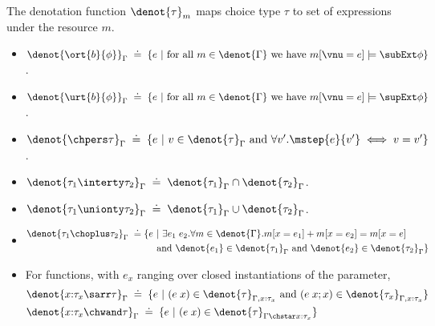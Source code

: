 \begin{definition}
    The denotation function $\denot{\tau}_m$ maps choice type $\tau$ to set of expressions under the resource $m$.
    \begin{itemize}
    \item $\denot{\ort{b}{\phi}}_\Gamma \;\doteq\;
          \{ e ~|~ \text{for all } m \in \denot{\Gamma} \text{ we have } m[\vnu = e] \models \subExt\phi \}$.
    \item $\denot{\urt{b}{\phi}}_\Gamma \;\doteq\;
          \{ e ~|~ \text{for all } m \in \denot{\Gamma} \text{ we have } m[\vnu = e] \models \supExt\phi \}$.
    \item $\denot{\chpers \tau}_\Gamma \;\doteq\;
          \{ e ~|~ v \in \denot{\tau}_\Gamma \text{ and } \forall v'. \mstep{e}{v'} \iff v = v' \}$.
    \item $\denot{\tau_1 \interty \tau_2}_\Gamma \;\doteq\;
          \denot{\tau_1}_\Gamma \cap \denot{\tau_2}_\Gamma$.
    \item $\denot{\tau_1 \unionty \tau_2}_\Gamma \;\doteq\;
          \denot{\tau_1}_\Gamma \cup \denot{\tau_2}_\Gamma$.
    \item 
    \begin{align*}
      \denot{\tau_1 \choplus \tau_2}_\Gamma \;\doteq\;&
          \{ e ~|~ \exists e_1\;e_2. \forall m \in \denot{\Gamma}. m[x=e_1] + m[x=e_2] = m[x=e] 
          \\ &\quad \text{ and } \denot{e_1} \in \denot{\tau_1}_\Gamma \text{ and } \denot{e_2} \in \denot{\tau_2}_\Gamma \}
    \end{align*}
    \item For functions, with $e_x$ ranging over closed instantiations of
      the parameter,
      \begin{align*}
        &\denot{x{:}\tau_x \sarr \tau}_\Gamma
          \;\doteq\;
          \{ e ~|~ (e\;x) \in \denot{\tau}_{\Gamma, x {:} \tau_x} \text{ and } (e\;x;x) \in \denot{\tau_x}_{\Gamma, x {:} \tau_x} \}
        \\&\denot{x{:}\tau_x \chwand \tau}_\Gamma
        \;\doteq\;
        \{ e ~|~ (e\;x) \in \denot{\tau}_{\Gamma \chstar x{:}\tau_x} \}
      \end{align*}
    \end{itemize}
  \end{definition}

